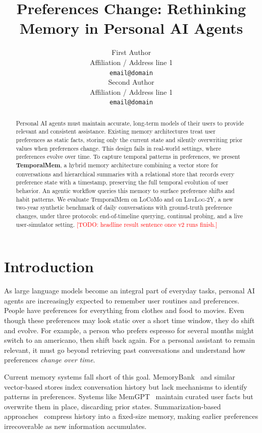 \documentclass[11pt]{article}
\title{Preferences Change: Rethinking Memory in Personal AI Agents}
\author{First Author \\
  Affiliation / Address line 1 \\
  \texttt{email@domain} \\\And
  Second Author \\
  Affiliation / Address line 1 \\
  \texttt{email@domain} \\}
\newcommand{\ours}{TemporalMem}
\newcommand{\dataset}{\textsc{LifeLog-2Y}}
\newcommand{\todo}[1]{\textcolor{red}{[TODO: #1]}}
\begin{document}
\maketitle

\begin{abstract}
Personal AI agents must maintain accurate, long-term models of their users to provide relevant and consistent assistance. Existing memory architectures treat user preferences as static facts, storing only the current state and silently overwriting prior values when preferences change. This design fails in real-world settings, where preferences evolve over time. To capture temporal patterns in preferences, we present \textbf{\ours}, a hybrid memory architecture combining a vector store for conversations and hierarchical summaries with a relational store that records every preference state with a timestamp, preserving the full temporal evolution of user behavior. An agentic workflow queries this memory to surface preference shifts and habit patterns. We evaluate \ours{} on LoCoMo and on \dataset, a new two-year synthetic benchmark of daily conversations with ground-truth preference changes, under three protocols: end-of-timeline querying, continual probing, and a live user-simulator setting. \todo{headline result sentence once v2 runs finish.}
\end{abstract}

\section{Introduction}

As large language models become an integral part of everyday tasks, personal AI agents are increasingly expected to remember user routines and preferences. People have preferences for everything from clothes and food to movies. Even though these preferences may look static over a short time window, they do shift and evolve. For example, a person who prefers espresso for several months might switch to an americano, then shift back again. For a personal assistant to remain relevant, it must go beyond retrieving past conversations and understand how preferences \textit{change over time}.

Current memory systems fall short of this goal. MemoryBank~\citep{zhong2023memorybank} and similar vector-based stores index conversation history but lack mechanisms to identify patterns in preferences. Systems like MemGPT~\citep{packer2024memgpt} maintain curated user facts but overwrite them in place, discarding prior states. Summarization-based approaches~\citep{wang2024recursively} compress history into a fixed-size memory, making earlier preferences irrecoverable as new information accumulates.
\end{document}
